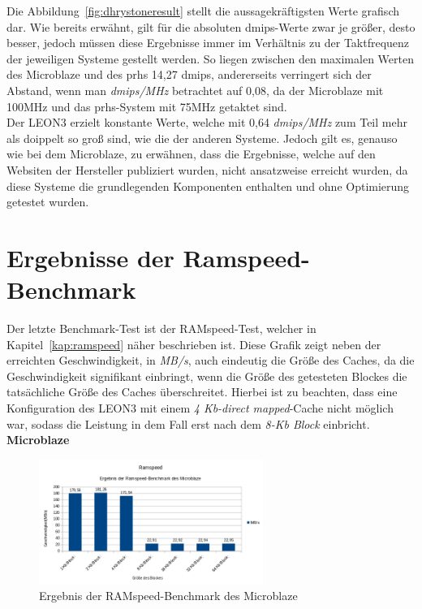 Die Abbildung~\ref{fig:dhrystoneresult} stellt die aussagekräftigsten Werte grafisch dar. Wie bereits erwähnt, gilt für die absoluten \ac{dmips}-Werte zwar je größer, desto besser, jedoch müssen diese
Ergebnisse immer im Verhältnis zu der Taktfrequenz der jeweiligen Systeme gestellt werden. So liegen zwischen den maximalen Werten des Microblaze und des \ac{prhs} 14,27 \ac{dmips}, andererseits
verringert sich der Abstand, wenn man \emph{\ac{dmips}/MHz} betrachtet auf 0,08, da der Microblaze mit 100MHz und das \ac{prhs}-System mit 75MHz getaktet sind.\\
Der LEON3 erzielt konstante Werte, welche mit 0,64 \emph{\ac{dmips}/MHz} zum Teil mehr als doippelt so groß sind, wie die der anderen Systeme. Jedoch gilt es, genauso wie bei dem Microblaze,
zu erwähnen, dass die Ergebnisse, welche auf den Websiten der Hersteller publiziert wurden, nicht ansatzweise erreicht wurden, da diese Systeme die grundlegenden Komponenten enthalten
und ohne Optimierung getestet wurden.\\

\section{Ergebnisse der Ramspeed-Benchmark}\label{kap:ramspeedtest}
Der letzte Benchmark-Test ist der RAMspeed-Test, welcher in Kapitel~\ref{kap:ramspeed} näher beschrieben ist. Diese Grafik zeigt neben der
erreichten Geschwindigkeit, in \emph{MB/s}, auch eindeutig die Größe des Caches, da die Geschwindigkeit signifikant einbringt, wenn die Größe des getesteten Blockes die tatsächliche Größe
des Caches überschreitet. Hierbei ist zu beachten, dass eine Konfiguration des LEON3 mit einem \emph{4 Kb-direct mapped}-Cache nicht möglich war, sodass die Leistung in dem Fall erst nach dem
\emph{8-Kb Block} einbricht.\\

\textbf{Microblaze}

\begin{figure}[H]
\centering
\includegraphics[width=0.65\textwidth]{Hauptteil/ramspeedmicroblaze.png}
\caption{Ergebnis der RAMspeed-Benchmark des Microblaze}
\label{fig:ramspeedmicroblaze}
\end{figure}

